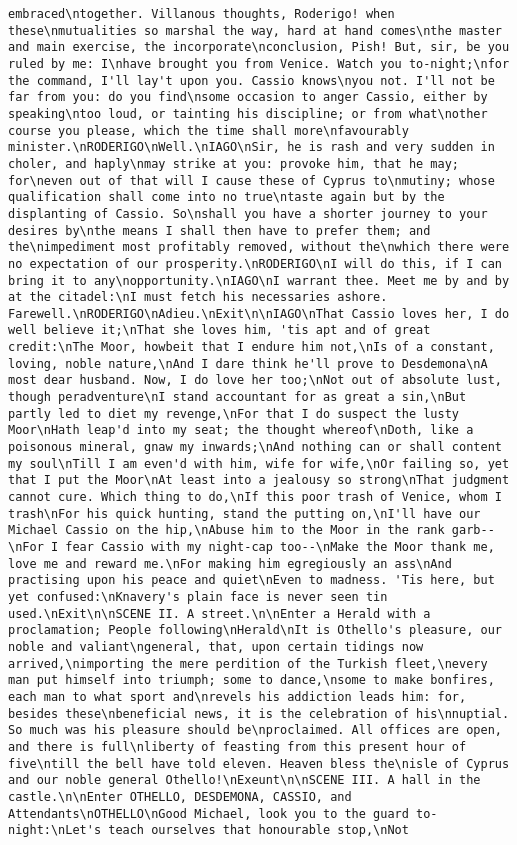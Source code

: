\begin{verbatim}
embraced\ntogether. Villanous thoughts, Roderigo! when these\nmutualities so marshal the way, hard at hand comes\nthe master and main exercise, the incorporate\nconclusion, Pish! But, sir, be you ruled by me: I\nhave brought you from Venice. Watch you to-night;\nfor the command, I'll lay't upon you. Cassio knows\nyou not. I'll not be far from you: do you find\nsome occasion to anger Cassio, either by speaking\ntoo loud, or tainting his discipline; or from what\nother course you please, which the time shall more\nfavourably minister.\nRODERIGO\nWell.\nIAGO\nSir, he is rash and very sudden in choler, and haply\nmay strike at you: provoke him, that he may; for\neven out of that will I cause these of Cyprus to\nmutiny; whose qualification shall come into no true\ntaste again but by the displanting of Cassio. So\nshall you have a shorter journey to your desires by\nthe means I shall then have to prefer them; and the\nimpediment most profitably removed, without the\nwhich there were no expectation of our prosperity.\nRODERIGO\nI will do this, if I can bring it to any\nopportunity.\nIAGO\nI warrant thee. Meet me by and by at the citadel:\nI must fetch his necessaries ashore. Farewell.\nRODERIGO\nAdieu.\nExit\n\nIAGO\nThat Cassio loves her, I do well believe it;\nThat she loves him, 'tis apt and of great credit:\nThe Moor, howbeit that I endure him not,\nIs of a constant, loving, noble nature,\nAnd I dare think he'll prove to Desdemona\nA most dear husband. Now, I do love her too;\nNot out of absolute lust, though peradventure\nI stand accountant for as great a sin,\nBut partly led to diet my revenge,\nFor that I do suspect the lusty Moor\nHath leap'd into my seat; the thought whereof\nDoth, like a poisonous mineral, gnaw my inwards;\nAnd nothing can or shall content my soul\nTill I am even'd with him, wife for wife,\nOr failing so, yet that I put the Moor\nAt least into a jealousy so strong\nThat judgment cannot cure. Which thing to do,\nIf this poor trash of Venice, whom I trash\nFor his quick hunting, stand the putting on,\nI'll have our Michael Cassio on the hip,\nAbuse him to the Moor in the rank garb--\nFor I fear Cassio with my night-cap too--\nMake the Moor thank me, love me and reward me.\nFor making him egregiously an ass\nAnd practising upon his peace and quiet\nEven to madness. 'Tis here, but yet confused:\nKnavery's plain face is never seen tin used.\nExit\n\nSCENE II. A street.\n\nEnter a Herald with a proclamation; People following\nHerald\nIt is Othello's pleasure, our noble and valiant\ngeneral, that, upon certain tidings now arrived,\nimporting the mere perdition of the Turkish fleet,\nevery man put himself into triumph; some to dance,\nsome to make bonfires, each man to what sport and\nrevels his addiction leads him: for, besides these\nbeneficial news, it is the celebration of his\nnuptial. So much was his pleasure should be\nproclaimed. All offices are open, and there is full\nliberty of feasting from this present hour of five\ntill the bell have told eleven. Heaven bless the\nisle of Cyprus and our noble general Othello!\nExeunt\n\nSCENE III. A hall in the castle.\n\nEnter OTHELLO, DESDEMONA, CASSIO, and Attendants\nOTHELLO\nGood Michael, look you to the guard to-night:\nLet's teach ourselves that honourable stop,\nNot 
\end{verbatim}
